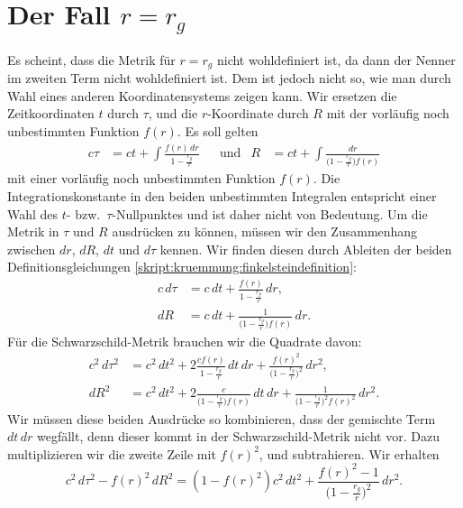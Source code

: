 \section{Der Fall $r=r_g$}
Es scheint, dass die Metrik für $r=r_g$ nicht wohldefiniert ist,
da dann der Nenner im zweiten Term nicht wohldefiniert ist.
Dem ist jedoch nicht so, wie man durch Wahl eines anderen Koordinatensystems
zeigen kann.
Wir ersetzen die Zeitkoordinaten $t$ durch $\tau$, und die $r$-Koordinate
durch $R$ mit der vorläufig noch unbestimmten Funktion $f(r)$.
Es soll gelten
\begin{equation}
\begin{aligned}
c\tau
&=
ct + \int\frac{f(r)\,dr}{\displaystyle 1-\frac{r_g}{r}}
&
&\text{und}
&
R
&=
ct
+
\int\frac{dr}{\displaystyle \biggl(1-\frac{r_g}{r}\biggr)f(r)}
\end{aligned}
\label{skript:kruemmung:finkelsteindefinition}
\end{equation}
mit einer vorläufig noch unbestimmten Funktion $f(r)$.
Die Integrationskonstante in den beiden unbestimmten Integralen
entspricht einer Wahl des $t$- bzw.~$\tau$-Nullpunktes und ist
daher nicht von Bedeutung.
Um die Metrik in $\tau$ und $R$ ausdrücken zu können, müssen wir 
den Zusammenhang zwischen $dr$, $dR$, $dt$ und $d\tau$ kennen.
Wir finden diesen durch Ableiten der beiden Definitionsgleichungen
\eqref{skript:kruemmung:finkelsteindefinition}:
\begin{align*}
c\,d\tau
&=
c\,dt + \frac{f(r)}{\displaystyle 1-\frac{r_g}{r}}\,dr,
\\
dR
&=
c\,dt
+
\frac{1}{\displaystyle\biggl(1-\frac{r_g}{r}\biggr)f(r)}\,dr.
\end{align*}
Für die Schwarzschild-Metrik brauchen wir die Quadrate davon:
\begin{align*}
c^2\,d\tau ^2
&=
c^2\,dt^2 + 2\frac{cf(r)}{\displaystyle 1-\frac{r_g}{r}}\,dt\,dr
+\frac{f(r)^2}{\biggl(\displaystyle 1-\frac{r_g}{r}\biggr)^2}\,dr^2,
\\
dR^2
&=
c^2\,dt^2 + 2\frac{c}{\displaystyle\biggl(1-\frac{r_g}{r}\biggr)f(r)}\,dt\,dr
+
\frac{1}{\displaystyle \biggl(1-\frac{r_g}{r}\biggr)^2f(r)^2}\,dr^2.
\end{align*}
Wir müssen diese beiden Ausdrücke so kombinieren, dass der gemischte
Term $dt\,dr$ wegfällt, denn dieser kommt in der Schwarzschild-Metrik
nicht vor.
Dazu multiplizieren wir die zweite Zeile mit $f(r)^2$, und subtrahieren.
Wir erhalten
\begin{equation}
c^2\,d\tau^2 - f(r)^2\,dR^2
=
(1-f(r)^2)c^2\,dt^2
+\frac{f(r)^2-1}{\displaystyle\biggl(1-\frac{r_g}{r}\biggr)^2}\,dr^2.
\end{equation}

